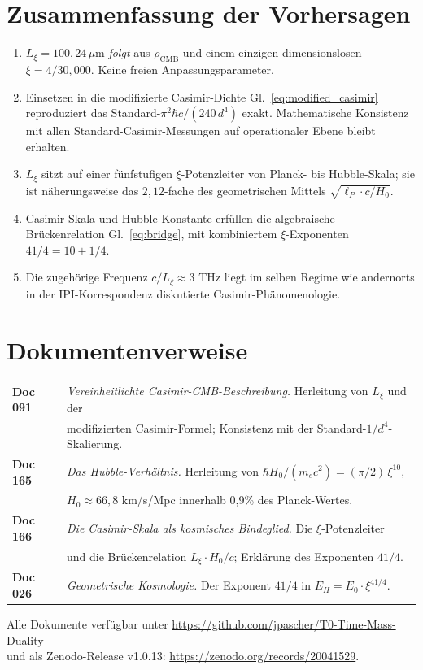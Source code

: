 \documentclass[11pt,a4paper]{article}
\begin{document}
\section{Zusammenfassung der Vorhersagen}

\begin{enumerate}\itemsep2pt
\item $L_\xi = 100{,}24\,\mu$m \emph{folgt} aus $\rho_{\mathrm{CMB}}$ und einem einzigen dimensionslosen $\xi = 4/30{,}000$. Keine freien Anpassungsparameter.
\item Einsetzen in die modifizierte Casimir-Dichte Gl.~\eqref{eq:modified_casimir} reproduziert das Standard-$\pi^2 \hbar c/(240\,d^4)$ exakt. Mathematische Konsistenz mit allen Standard-Casimir-Messungen auf operationaler Ebene bleibt erhalten.
\item $L_\xi$ sitzt auf einer fünfstufigen $\xi$-Potenzleiter von Planck- bis Hubble-Skala; sie ist näherungsweise das $2{,}12$-fache des geometrischen Mittels $\sqrt{\ell_P \cdot c/H_0}$.
\item Casimir-Skala und Hubble-Konstante erfüllen die algebraische Brückenrelation Gl.~\eqref{eq:bridge}, mit kombiniertem $\xi$-Exponenten $41/4 = 10 + 1/4$.
\item Die zugehörige Frequenz $c/L_\xi \approx 3$ THz liegt im selben Regime wie andernorts in der IPI-Korrespondenz diskutierte Casimir-Phänomenologie.
\end{enumerate}

\section*{Dokumentenverweise}

\noindent\small\begin{tabular}{ll}
\textbf{Doc 091} & \emph{Vereinheitlichte Casimir-CMB-Beschreibung.} Herleitung von $L_\xi$ und der \\
& modifizierten Casimir-Formel; Konsistenz mit der Standard-$1/d^4$-Skalierung. \\[2pt]
\textbf{Doc 165} & \emph{Das Hubble-Verhältnis.} Herleitung von $\hbar H_0 / (m_e c^2) = (\pi/2)\,\xi^{10}$, \\
& $H_0 \approx 66{,}8$ km/s/Mpc innerhalb 0,9\% des Planck-Wertes. \\[2pt]
\textbf{Doc 166} & \emph{Die Casimir-Skala als kosmisches Bindeglied.} Die $\xi$-Potenzleiter \\
& und die Brückenrelation $L_\xi \cdot H_0/c$; Erklärung des Exponenten $41/4$. \\[2pt]
\textbf{Doc 026} & \emph{Geometrische Kosmologie.} Der Exponent $41/4$ in $E_H = E_0 \cdot \xi^{41/4}$. \\
\end{tabular}

\medskip
Alle Dokumente verfügbar unter \url{https://github.com/jpascher/T0-Time-Mass-Duality}\\
und als Zenodo-Release v1.0.13: \url{https://zenodo.org/records/20041529}.
\end{document}
